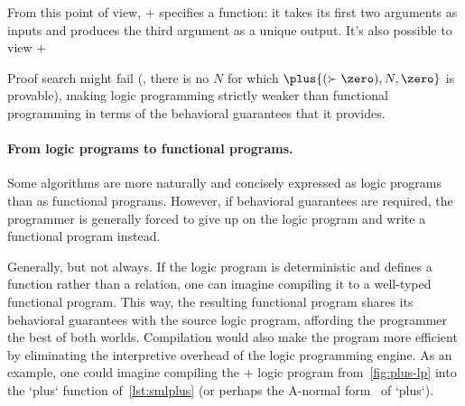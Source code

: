 From this point of view, $\plus{}$ specifies a function: it takes its first two arguments as inputs and produces the third argument as a unique output.
It's also possible to view $\plus{}$


Proof search might fail (\eg, there is no $N$ for which $\plus{(\succ{\zero}),N,\zero}$ is provable), making logic programming strictly weaker than functional programming in terms of the behavioral guarantees that it provides.




\paragraph{From logic programs to functional programs.}
Some algorithms are more naturally and concisely expressed as logic programs than as functional programs.
%
However, if behavioral guarantees are required, the programmer is generally forced to give up on the logic program and write a functional program instead.

Generally, but not always.
If the logic program is deterministic and defines a function rather than a relation, one can imagine compiling it to a well-typed functional program.
%
This way, the resulting functional program shares its behavioral guarantees with the source logic program, affording the programmer the best of both worlds.
Compilation would also make the program more efficient by eliminating the interpretive overhead of the logic programming engine.
As an example, one could imagine compiling the $\plus{}$ logic program from~\cref{fig:plus-lp} into the \sml`plus` function of~\cref{lst:smlplus} (or perhaps the A-normal form~\autocite{Sabry+Felleisen:LASC93} of \sml`plus`).


